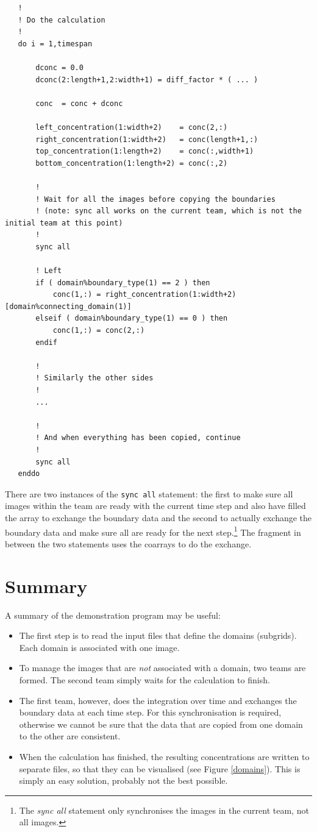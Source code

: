 \documentclass[onecolumn]{article}
\begin{document}
\begin{lstlisting}
   !
   ! Do the calculation
   !
   do i = 1,timespan

       dconc = 0.0
       dconc(2:length+1,2:width+1) = diff_factor * ( ... )

       conc  = conc + dconc

       left_concentration(1:width+2)    = conc(2,:)
       right_concentration(1:width+2)   = conc(length+1,:)
       top_concentration(1:length+2)    = conc(:,width+1)
       bottom_concentration(1:length+2) = conc(:,2)

       !
       ! Wait for all the images before copying the boundaries
       ! (note: sync all works on the current team, which is not the initial team at this point)
       !
       sync all

       ! Left
       if ( domain%boundary_type(1) == 2 ) then
           conc(1,:) = right_concentration(1:width+2)[domain%connecting_domain(1)]
       elseif ( domain%boundary_type(1) == 0 ) then
           conc(1,:) = conc(2,:)
       endif

       !
       ! Similarly the other sides
       !
       ...

       !
       ! And when everything has been copied, continue
       !
       sync all
   enddo
\end{lstlisting}

There are two instances of the \verb+sync all+ statement: the first to make sure all images within the team are ready with the current
time step and also have filled the array to exchange the boundary data and the second to actually exchange the boundary data and
make sure all are ready for the next step.\footnote{The \emph{sync all} statement only synchronises the images in the current team, not all images.}
The fragment in between the two statements uses the coarrays to do the exchange.


\section{Summary}
A summary of the demonstration program may be useful:
\begin{itemize}
\item
The first step is to read the input files that define the domains (subgrids). Each domain is associated with one image.
\item
To manage the images that are \emph{not} associated with a domain, two teams are formed. The second team simply waits for the calculation
to finish.
\item
The first team, however, does the integration over time and exchanges the boundary data at each time step. For this synchronisation is
required, otherwise we cannot be sure that the data that are copied from one domain to the other are consistent.
\item
When the calculation has finished, the resulting concentrations are written to separate files, so that they can be visualised (see Figure \ref{domains}). This is
simply an easy solution, probably not the best possible.
\end{itemize}
\end{document}
